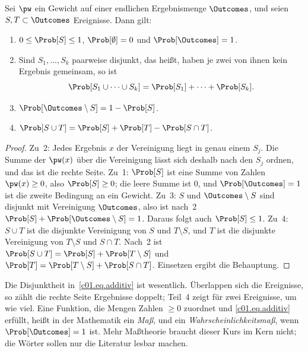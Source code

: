 \begin{proposition}\label{c01.prop.wahrscheinlichkeit}
  Sei $\pw$ ein Gewicht auf einer endlichen Ergebnismenge $\Outcomes$, und seien
  $S, T \subset \Outcomes$ Ereignisse. Dann gilt:
  \begin{enumerate}
    \item $0 \leq \Prob[S] \leq 1$, $\Prob[\emptyset] = 0$ und $\Prob[\Outcomes] = 1$.
    \item Sind $S_1, \dots, S_k$ paarweise disjunkt, das heißt, haben je zwei von ihnen
      kein Ergebnis gemeinsam, so ist
      \begin{equation}\label{c01.eq.additiv}
        \Prob[S_1 \cup \dots \cup S_k] = \Prob[S_1] + \dots + \Prob[S_k] .
      \end{equation}
    \item $\Prob[\Outcomes \setminus S] = 1 - \Prob[S]$.
    \item $\Prob[S \cup T] = \Prob[S] + \Prob[T] - \Prob[S \cap T]$.
  \end{enumerate}
\end{proposition}
\begin{proof}
  Zu~2: Jedes Ergebnis $x$ der Vereinigung liegt in genau einem $S_j$. Die Summe der
  $\pw(x)$ über die Vereinigung lässt sich deshalb nach den $S_j$ ordnen, und das ist die
  rechte Seite. Zu~1: $\Prob[S]$ ist eine Summe von Zahlen $\pw(x) \geq 0$, also
  $\Prob[S] \geq 0$; die leere Summe ist $0$, und $\Prob[\Outcomes] = 1$ ist die zweite
  Bedingung an ein Gewicht. Zu~3: $S$ und $\Outcomes \setminus S$ sind disjunkt mit
  Vereinigung $\Outcomes$, also ist nach~2 $\Prob[S] + \Prob[\Outcomes \setminus S] = 1$.
  Daraus folgt auch $\Prob[S] \leq 1$. Zu~4: $S \cup T$ ist die disjunkte Vereinigung von
  $S$ und $T \setminus S$, und $T$ ist die disjunkte Vereinigung von $T \setminus S$ und
  $S \cap T$. Nach~2 ist $\Prob[S \cup T] = \Prob[S] + \Prob[T \setminus S]$ und
  $\Prob[T] = \Prob[T \setminus S] + \Prob[S \cap T]$. Einsetzen ergibt die Behauptung.
\end{proof}

Die Disjunktheit in~\eqref{c01.eq.additiv} ist wesentlich. Überlappen sich die Ereignisse,
so zählt die rechte Seite Ergebnisse doppelt; Teil~4 zeigt für zwei Ereignisse, um wie viel.
Eine Funktion, die Mengen Zahlen $\geq 0$ zuordnet und \eqref{c01.eq.additiv} erfüllt, heißt in der
Mathematik ein \emph{Maß}, und ein \emph{Wahrscheinlichkeitsmaß}, wenn
$\Prob[\Outcomes] = 1$ ist. Mehr Maßtheorie braucht dieser Kurs im Kern nicht; die Wörter
sollen nur die Literatur lesbar machen.

